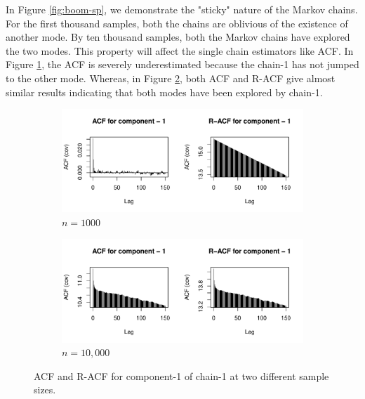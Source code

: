 \documentclass[12pt]{article}
\begin{document}
In Figure \ref{fig:boom-sp}, we demonstrate the "sticky" nature of the Markov chains. For the first thousand samples, both the chains are oblivious of the existence of another mode. By ten thousand samples, both the Markov chains have explored the two modes. This property will affect the single chain estimators like ACF. In Figure \ref{subfig:boom-acf_1e3}, the ACF is severely underestimated because the chain-1 has not jumped to the other mode. Whereas, in Figure \ref{subfig:boom-acf_1e4}, both ACF and R-ACF give almost similar results indicating that both modes have been explored by chain-1.   

\begin{figure}[h]
    \centering
    \begin{subfigure}[h]{.7\textwidth}
      \centering
      \includegraphics[width = \textwidth]{boom-acf_1e3.pdf}
      \caption{$n = 1000$}
      \label{subfig:boom-acf_1e3}
    \end{subfigure}
    \begin{subfigure}[h]{.7\textwidth}
      \centering
      \includegraphics[width = \textwidth]{boom-acf_1e4.pdf}
      \caption{$n = 10,000$}
      \label{subfig:boom-acf_1e4}
    \end{subfigure}
    \caption{ACF and R-ACF for component-1 of chain-1 at two different sample sizes. }
    \label{fig:boom-acf}
\end{figure}
\end{document}
